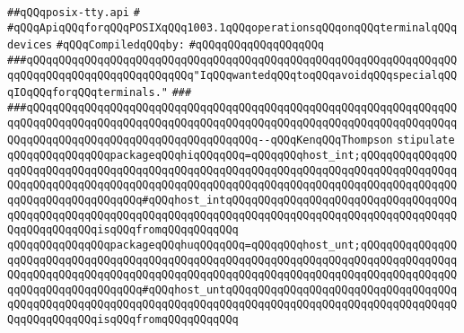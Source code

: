 \label{src/lib/std/src/psx/posix-tty.api}
\verb|##qQQqposix-tty.api|\newline
\verb|#|\newline
\verb|#qQQqApiqQQqforqQQqPOSIXqQQq1003.1qQQqoperationsqQQqonqQQqterminalqQQqdevices|\newline
\newline
\verb|#qQQqCompiledqQQqby:|\newline
\verb|#qQQqqQQqqQQqqQQqqQQq|\newline
\newline
\newline
\newline
\newline
\newline
\newline
\verb|###qQQqqQQqqQQqqQQqqQQqqQQqqQQqqQQqqQQqqQQqqQQqqQQqqQQqqQQqqQQqqQQqqQQqqQQqqQQqqQQqqQQqqQQqqQQqqQQq"IqQQqwantedqQQqtoqQQqavoidqQQqspecialqQQqIOqQQqforqQQqterminals."|\newline
\verb|###|\newline
\verb|###qQQqqQQqqQQqqQQqqQQqqQQqqQQqqQQqqQQqqQQqqQQqqQQqqQQqqQQqqQQqqQQqqQQqqQQqqQQqqQQqqQQqqQQqqQQqqQQqqQQqqQQqqQQqqQQqqQQqqQQqqQQqqQQqqQQqqQQqqQQqqQQqqQQqqQQqqQQqqQQqqQQqqQQqqQQqqQQq--qQQqKenqQQqThompson|\newline
\newline
\newline
\verb|stipulate|\newline
\verb|qQQqqQQqqQQqqQQqpackageqQQqhiqQQqqQQq=qQQqqQQqhost_int;qQQqqQQqqQQqqQQqqQQqqQQqqQQqqQQqqQQqqQQqqQQqqQQqqQQqqQQqqQQqqQQqqQQqqQQqqQQqqQQqqQQqqQQqqQQqqQQqqQQqqQQqqQQqqQQqqQQqqQQqqQQqqQQqqQQqqQQqqQQqqQQqqQQqqQQqqQQqqQQqqQQqqQQqqQQqqQQq#qQQqhost_intqQQqqQQqqQQqqQQqqQQqqQQqqQQqqQQqqQQqqQQqqQQqqQQqqQQqqQQqqQQqqQQqqQQqqQQqqQQqqQQqqQQqqQQqqQQqqQQqqQQqqQQqqQQqqQQqqQQqqQQqisqQQqfromqQQqqQQqqQQq|\newline
\verb|qQQqqQQqqQQqqQQqpackageqQQqhuqQQqqQQq=qQQqqQQqhost_unt;qQQqqQQqqQQqqQQqqQQqqQQqqQQqqQQqqQQqqQQqqQQqqQQqqQQqqQQqqQQqqQQqqQQqqQQqqQQqqQQqqQQqqQQqqQQqqQQqqQQqqQQqqQQqqQQqqQQqqQQqqQQqqQQqqQQqqQQqqQQqqQQqqQQqqQQqqQQqqQQqqQQqqQQqqQQqqQQq#qQQqhost_untqQQqqQQqqQQqqQQqqQQqqQQqqQQqqQQqqQQqqQQqqQQqqQQqqQQqqQQqqQQqqQQqqQQqqQQqqQQqqQQqqQQqqQQqqQQqqQQqqQQqqQQqqQQqqQQqqQQqqQQqisqQQqfromqQQqqQQqqQQq|\newline
